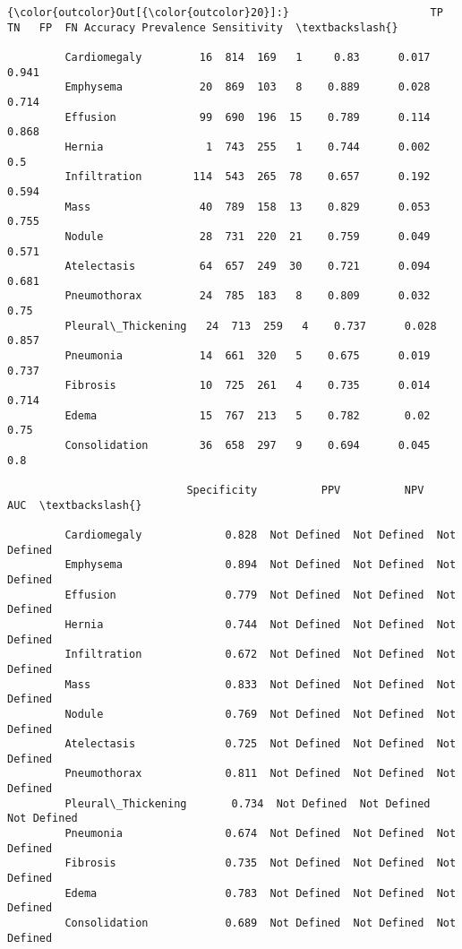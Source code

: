 \documentclass[11pt]{article}
\begin{document}
\begin{Verbatim}[commandchars=\\\{\}]
{\color{outcolor}Out[{\color{outcolor}20}]:}                      TP   TN   FP  FN Accuracy Prevalence Sensitivity  \textbackslash{}
                                                                                 
         Cardiomegaly         16  814  169   1     0.83      0.017       0.941   
         Emphysema            20  869  103   8    0.889      0.028       0.714   
         Effusion             99  690  196  15    0.789      0.114       0.868   
         Hernia                1  743  255   1    0.744      0.002         0.5   
         Infiltration        114  543  265  78    0.657      0.192       0.594   
         Mass                 40  789  158  13    0.829      0.053       0.755   
         Nodule               28  731  220  21    0.759      0.049       0.571   
         Atelectasis          64  657  249  30    0.721      0.094       0.681   
         Pneumothorax         24  785  183   8    0.809      0.032        0.75   
         Pleural\_Thickening   24  713  259   4    0.737      0.028       0.857   
         Pneumonia            14  661  320   5    0.675      0.019       0.737   
         Fibrosis             10  725  261   4    0.735      0.014       0.714   
         Edema                15  767  213   5    0.782       0.02        0.75   
         Consolidation        36  658  297   9    0.694      0.045         0.8   
         
                            Specificity          PPV          NPV          AUC  \textbackslash{}
                                                                                 
         Cardiomegaly             0.828  Not Defined  Not Defined  Not Defined   
         Emphysema                0.894  Not Defined  Not Defined  Not Defined   
         Effusion                 0.779  Not Defined  Not Defined  Not Defined   
         Hernia                   0.744  Not Defined  Not Defined  Not Defined   
         Infiltration             0.672  Not Defined  Not Defined  Not Defined   
         Mass                     0.833  Not Defined  Not Defined  Not Defined   
         Nodule                   0.769  Not Defined  Not Defined  Not Defined   
         Atelectasis              0.725  Not Defined  Not Defined  Not Defined   
         Pneumothorax             0.811  Not Defined  Not Defined  Not Defined   
         Pleural\_Thickening       0.734  Not Defined  Not Defined  Not Defined   
         Pneumonia                0.674  Not Defined  Not Defined  Not Defined   
         Fibrosis                 0.735  Not Defined  Not Defined  Not Defined   
         Edema                    0.783  Not Defined  Not Defined  Not Defined   
         Consolidation            0.689  Not Defined  Not Defined  Not Defined   
         

\end{Verbatim}
\end{document}
